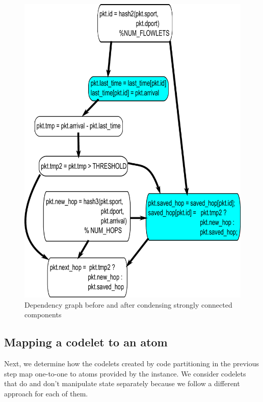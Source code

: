 \begin{figure}[!t]
\begin{minipage}{0.5\textwidth}
\includegraphics[width=\columnwidth]{scc.pdf}
\end{minipage}
\caption{Dependency graph before and after condensing strongly connected components}
\label{fig:partitioning}
\end{figure}

\subsection{Mapping a codelet to an atom}
\label{ss:complexity}
Next, we determine how the codelets created by code partitioning in the
previous step map one-to-one to atoms provided by the \absmachine instance. We
consider codelets that do and don't manipulate state separately because we
follow a different approach for each of them.

